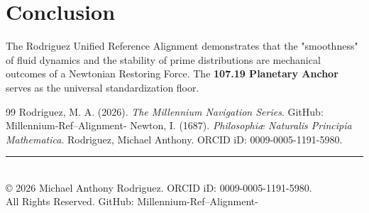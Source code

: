 \documentclass[12pt]{article}
\begin{document}
\section{Conclusion}
The Rodriguez Unified Reference Alignment demonstrates that the "smoothness" of fluid dynamics and the stability of prime distributions are mechanical outcomes of a Newtonian Restoring Force. The \textbf{107.19 Planetary Anchor} serves as the universal standardization floor. 

\begin{thebibliography}{99}
 Rodriguez, M. A. (2026). \textit{The Millennium Navigation Series}. GitHub: Millennium-Ref--Alignment-
 Newton, I. (1687). \textit{Philosophiæ Naturalis Principia Mathematica}.
 Rodriguez, Michael Anthony. ORCID iD: 0009-0005-1191-5980.
\end{thebibliography}

\vfill
\begin{center}
\rule{0.5\textwidth}{0.4pt} \\
\small © 2026 Michael Anthony Rodriguez. ORCID iD: 0009-0005-1191-5980. \\ All Rights Reserved. GitHub: Millennium-Ref--Alignment-
\end{center}
\end{document}
